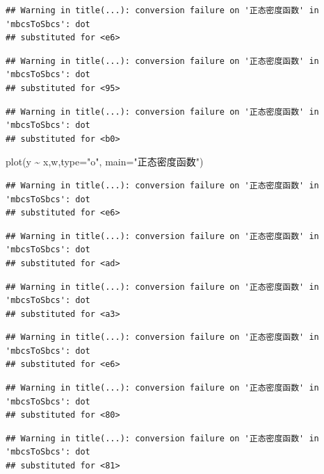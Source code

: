 \documentclass[
]{book}
\newenvironment{Shaded}{\begin{snugshade}}{\end{snugshade}}
\newcommand{\AttributeTok}[1]{\textcolor[rgb]{0.77,0.63,0.00}{#1}}
\newcommand{\FunctionTok}[1]{\textcolor[rgb]{0.00,0.00,0.00}{#1}}
\newcommand{\NormalTok}[1]{#1}
\newcommand{\SpecialCharTok}[1]{\textcolor[rgb]{0.00,0.00,0.00}{#1}}
\newcommand{\StringTok}[1]{\textcolor[rgb]{0.31,0.60,0.02}{#1}}
\begin{document}
\begin{verbatim}
## Warning in title(...): conversion failure on '正态密度函数' in 'mbcsToSbcs': dot
## substituted for <e6>
\end{verbatim}

\begin{verbatim}
## Warning in title(...): conversion failure on '正态密度函数' in 'mbcsToSbcs': dot
## substituted for <95>
\end{verbatim}

\begin{verbatim}
## Warning in title(...): conversion failure on '正态密度函数' in 'mbcsToSbcs': dot
## substituted for <b0>
\end{verbatim}

\begin{Shaded}
\begin{Highlighting}[]
\FunctionTok{plot}\NormalTok{(y }\SpecialCharTok{\textasciitilde{}}\NormalTok{ x,w,}\AttributeTok{type=}\StringTok{"o"}\NormalTok{, }\AttributeTok{main=}\StringTok{"正态密度函数"}\NormalTok{)}
\end{Highlighting}
\end{Shaded}

\begin{verbatim}
## Warning in title(...): conversion failure on '正态密度函数' in 'mbcsToSbcs': dot
## substituted for <e6>
\end{verbatim}

\begin{verbatim}
## Warning in title(...): conversion failure on '正态密度函数' in 'mbcsToSbcs': dot
## substituted for <ad>
\end{verbatim}

\begin{verbatim}
## Warning in title(...): conversion failure on '正态密度函数' in 'mbcsToSbcs': dot
## substituted for <a3>
\end{verbatim}

\begin{verbatim}
## Warning in title(...): conversion failure on '正态密度函数' in 'mbcsToSbcs': dot
## substituted for <e6>
\end{verbatim}

\begin{verbatim}
## Warning in title(...): conversion failure on '正态密度函数' in 'mbcsToSbcs': dot
## substituted for <80>
\end{verbatim}

\begin{verbatim}
## Warning in title(...): conversion failure on '正态密度函数' in 'mbcsToSbcs': dot
## substituted for <81>
\end{verbatim}
\end{document}

